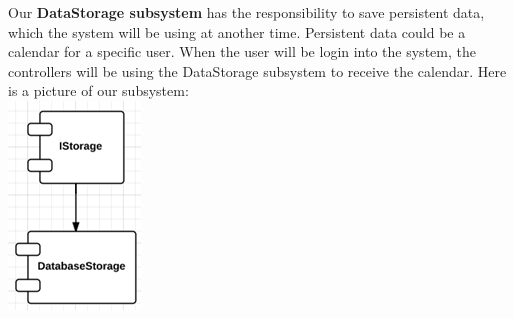 Our \textbf{DataStorage subsystem} has the responsibility to save persistent data, which the system will be using at another time. Persistent data could be a calendar for a specific user. When the user will be login into the system, the controllers will be using the DataStorage subsystem to receive the calendar. Here is a picture of our subsystem:\\
\includegraphics[scale=0.8]{datastorageSubsystem}